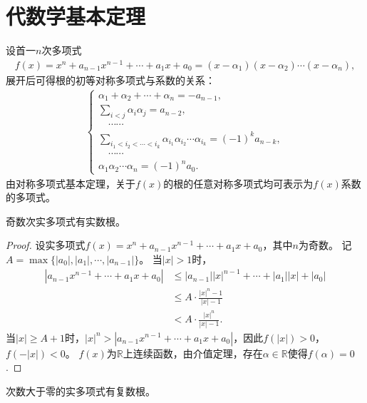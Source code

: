 \documentclass[../../main.tex]{subfiles}%
\begin{document}
\section{代数学基本定理}

设首一$n$次多项式
\begin{align}
f(x)=x^n+a_{n-1}x^{n-1}+\cdots+a_1x+a_0=(x-\alpha_1)(x-\alpha_2)\cdots(x-\alpha_n),\label{eq:poly-root}
\end{align}
展开后可得根的初等对称多项式与系数的关系：
\begin{align*}
\begin{cases}
\alpha_1+\alpha_2+\cdots+\alpha_n=-a_{n-1},\\
\displaystyle\sum\limits_{i<j}\alpha_i\alpha_j=a_{n-2},\\
\quad\cdots\cdots\\
\displaystyle\sum\limits_{i_1<i_2<\cdots<i_k}\alpha_{i_1}\alpha_{i_2}\cdots\alpha_{i_k}=(-1)^k a_{n-k},\\
\quad\cdots\cdots\\
\alpha_1\alpha_2\cdots\alpha_n=(-1)^n a_0.
\end{cases}
\end{align*}
由对称多项式基本定理，关于$f(x)$的根的任意对称多项式均可表示为$f(x)$系数的多项式。

\begin{lemma}
奇数次实多项式有实数根。
\end{lemma}

\begin{proof}

设实多项式$f(x)=x^n+a_{n-1}x^{n-1}+\cdots+a_1x+a_0$，其中$n$为奇数。
记$A=\max\{|a_0|,|a_1|,\cdots,|a_{n-1}|\}$。
当$|x|>1$时，
\begin{align*}
|a_{n-1}x^{n-1}+\cdots+a_1x+a_0|&\leqslant|a_{n-1}||x|^{n-1}+\cdots+|a_1||x|+|a_0|\\
&\leqslant A\cdot\frac{|x|^n-1}{|x|-1}\\
&<A\cdot\frac{|x|^n}{|x|-1}.
\end{align*}
当$|x|\geqslant A+1$时，$|x|^n>|a_{n-1}x^{n-1}+\cdots+a_1x+a_0|$，因此$f(|x|)>0$，$f(-|x|)<0$。
$f(x)$为$\mathbb{R}$上连续函数，由介值定理，存在$\alpha\in\mathbb{R}$使得$f(\alpha)=0$.

\end{proof}

\begin{lemma}
次数大于零的实多项式有复数根。
\end{lemma}
\end{document}

